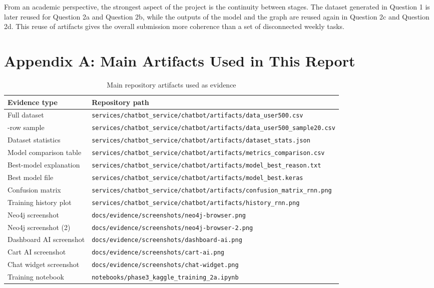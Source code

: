 \documentclass[12pt,a4paper]{article}
\begin{document}
From an academic perspective, the strongest aspect of the project is the continuity between stages. The dataset generated in Question 1 is later reused for Question 2a and Question 2b, while the outputs of the model and the graph are reused again in Question 2c and Question 2d. This reuse of artifacts gives the overall submission more coherence than a set of disconnected weekly tasks.

\clearpage
\appendix
\section{Appendix A: Main Artifacts Used in This Report}

\begin{table}[H]
\centering
\caption{Main repository artifacts used as evidence}
\begin{tabularx}{\linewidth}{>{\raggedright\arraybackslash}p{4cm} >{\raggedright\arraybackslash}X}
\toprule
Evidence type & Repository path \\
\midrule
Full dataset & \texttt{services/chatbot\_service/chatbot/artifacts/data\_user500.csv} \\
20-row sample & \texttt{services/chatbot\_service/chatbot/artifacts/data\_user500\_sample20.csv} \\
Dataset statistics & \texttt{services/chatbot\_service/chatbot/artifacts/dataset\_stats.json} \\
Model comparison table & \texttt{services/chatbot\_service/chatbot/artifacts/metrics\_comparison.csv} \\
Best-model explanation & \texttt{services/chatbot\_service/chatbot/artifacts/model\_best\_reason.txt} \\
Best model file & \texttt{services/chatbot\_service/chatbot/artifacts/model\_best.keras} \\
Confusion matrix & \texttt{services/chatbot\_service/chatbot/artifacts/confusion\_matrix\_rnn.png} \\
Training history plot & \texttt{services/chatbot\_service/chatbot/artifacts/history\_rnn.png} \\
Neo4j screenshot & \texttt{docs/evidence/screenshots/neo4j-browser.png} \\
Neo4j screenshot (2) & \texttt{docs/evidence/screenshots/neo4j-browser-2.png} \\
Dashboard AI screenshot & \texttt{docs/evidence/screenshots/dashboard-ai.png} \\
Cart AI screenshot & \texttt{docs/evidence/screenshots/cart-ai.png} \\
Chat widget screenshot & \texttt{docs/evidence/screenshots/chat-widget.png} \\
Training notebook & \texttt{notebooks/phase3\_kaggle\_training\_2a.ipynb} \\
\bottomrule
\end{tabularx}
\end{table}
\end{document}
